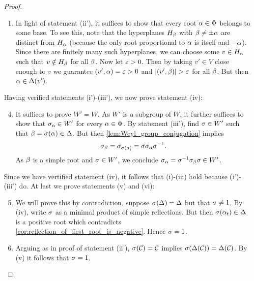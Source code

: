 \documentclass[12pt,reqno,oneside]{amsart}
\begin{document}
\begin{proof}
\begin{enumerate}[label=(\roman*')]
            \item In light of statement (ii'), it suffices to show that every root $\alpha \in \Phi$ belongs to some base. To see this, note that the hyperplanes $H_{\beta}$ with $\beta \neq \pm\alpha$ are distinct from $H_{\alpha}$ (because the only root proportional to $\alpha$ is itself and $-\alpha$). Since there are finitely many such hyperplanes, we can choose some $v \in H_{\alpha}$ such that $v \notin H_{\beta}$ for all $\beta$. Now let $\varepsilon > 0$. Then by taking $v' \in V$ close enough to $v$ we guarantee $(v',\alpha) = \varepsilon > 0$ and $|(v',\beta)| > \varepsilon$ for all $\beta$. But then $\alpha \in \Delta(v')$.
        \end{enumerate}
       Having verified statements (i')-(iii'), we now prove statement (iv):
        \begin{enumerate}[label=(\roman*)]
            \setcounter{enumi}{3}
            \item It suffices to prove $W' = W$. As $W'$ is a subgroup of $W$, it further suffices to show that $\sigma_{\alpha} \in W'$ for every $\alpha \in \Phi$. By statement (iii'), find $\sigma \in W'$ such that $\beta = \sigma(\alpha) \in \Delta$. But then \cref{lem:Weyl_group_conjugation} implies
            \[
                \sigma_{\beta} = \sigma_{\sigma(a)} = \sigma\sigma_{\alpha}\sigma^{-1}.
            \]
            As $\beta$ is a simple root and $\sigma \in W'$, we conclude $\sigma_{\alpha} = \sigma^{-1}\sigma_{\beta}\sigma \in W'$.
        \end{enumerate}
        Since we have vertified statement (iv), it follows that (i)-(iii) hold because (i')-(iii') do. At last we prove statements (v) and (vi):
        \begin{enumerate}[label=(\roman*)]
            \setcounter{enumi}{4}
            \item We will prove this by contradiction. suppose $\sigma(\Delta) = \Delta$ but that $\sigma \neq 1$. By (iv), write $\sigma$ as a minimal product of simple reflections. But then $\sigma(\alpha_{t}) \in \Delta$ is a positive root which contradicts \cref{cor:reflection_of_first_root_is_negative}. Hence $\sigma = 1$.
            \item Arguing as in proof of statement (ii'), $\sigma(\mathcal{C}) = \mathcal{C}$ implies $\sigma(\Delta(\mathcal{C})) = \Delta(\mathcal{C})$. By (v) it follows that $\sigma = 1$.
        \end{enumerate}
    \end{proof}
\end{document}
